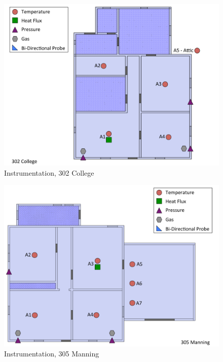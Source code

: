 \documentclass[12pt,oneside]{book}
\begin{document}
\begin{figure}[!ht]
\includegraphics[width=6.5in]{../Drawings/Instrumentation/302_College}
\caption{Instrumentation, 302 College}
\label{fig:Instrumentation_302_College}
\end{figure}

\begin{figure}[!ht]
\includegraphics[width=6.5in]{../Drawings/Instrumentation/305_Manning}
\caption{Instrumentation, 305 Manning}
\label{fig:Instrumentation_305_Manning}
\end{figure}
\end{document}
